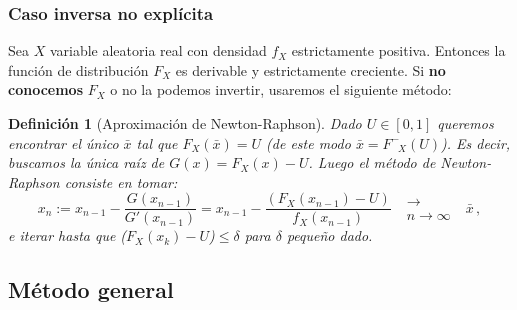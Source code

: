 \documentclass[letterpaper,11pt]{article} %
\theoremstyle{defbreak}
\newtheorem{definition}{Definición}[subsection]
\theoremstyle{propbreak}
\theoremstyle{remark}
\theoremstyle{break}
\def\conv{\mbox{ }\substack{\longrightarrow \\ n\to\infty}\mbox{ }}
\def\Finvgen{F^-_{\mbox{ }X}}
\begin{document}
\subsubsection{Caso inversa no explícita}
Sea $X$ variable aleatoria real con densidad $f_X$ estrictamente positiva. Entonces la función de distribución $F_X$ es derivable y estrictamente creciente. Si \textbf{no conocemos} $F_X$ %
o no la podemos invertir, usaremos el siguiente método:
\begin{definition}[Aproximación de Newton-Raphson]
Dado $U\in[0,1]$ queremos encontrar el único $\bar{x}$ tal que $F_X(\bar{x})=U$ (de este modo $\bar{x}=\Finvgen(U)$). Es decir, buscamos la única raíz de $G(x)=F_X(x)-U$.
\newline Luego el método de Newton-Raphson consiste en tomar:
$$ x_n:=x_{n-1}-\displaystyle\frac{G(x_{n-1})}{G'(x_{n-1})}=x_{n-1}-\frac{(F_X(x_{n-1})-U)}{f_X(x_{n-1})}\conv \bar{x} \, ,$$
e iterar hasta que ($F_X(x_k)-U$)$\leq\delta$ para $\delta$ pequeño dado.
\end{definition}

\subsection{Método general}
\end{document}
